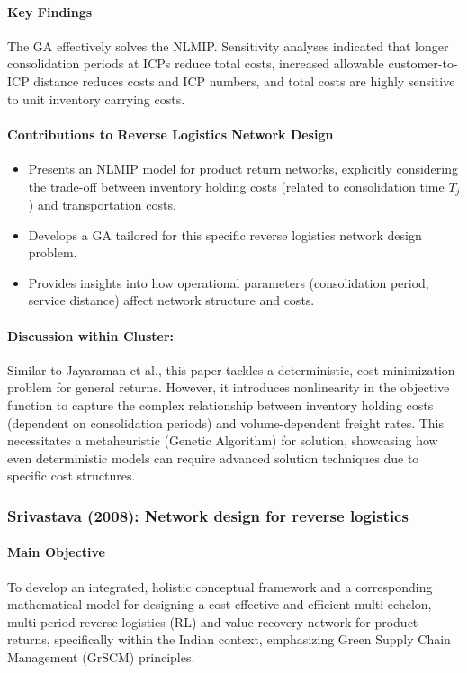 \paragraph{Key Findings} The GA effectively solves the NLMIP. Sensitivity analyses indicated that longer consolidation periods at ICPs reduce total costs, increased allowable customer-to-ICP distance reduces costs and ICP numbers, and total costs are highly sensitive to unit inventory carrying costs.
\paragraph{Contributions to Reverse Logistics Network Design}
\begin{itemize}
    \item Presents an NLMIP model for product return networks, explicitly considering the trade-off between inventory holding costs (related to consolidation time $T_j$) and transportation costs.
    \item Develops a GA tailored for this specific reverse logistics network design problem.
    \item Provides insights into how operational parameters (consolidation period, service distance) affect network structure and costs.
\end{itemize}
\paragraph{Discussion within Cluster:} Similar to Jayaraman et al., this paper tackles a deterministic, cost-minimization problem for general returns. However, it introduces nonlinearity in the objective function to capture the complex relationship between inventory holding costs (dependent on consolidation periods) and volume-dependent freight rates. This necessitates a metaheuristic (Genetic Algorithm) for solution, showcasing how even deterministic models can require advanced solution techniques due to specific cost structures.

\subsubsection{Srivastava (2008): Network design for reverse logistics}
\paragraph{Main Objective} To develop an integrated, holistic conceptual framework and a corresponding mathematical model for designing a cost-effective and efficient multi-echelon, multi-period reverse logistics (RL) and value recovery network for product returns, specifically within the Indian context, emphasizing Green Supply Chain Management (GrSCM) principles.
